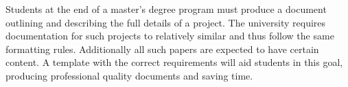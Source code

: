 \label{sec:problem_definition_statement}
Students at the end of a master's degree program must produce a document outlining and describing the full details of a project. The university requires documentation for such projects to relatively similar and thus follow the same formatting rules. Additionally all such papers are expected to have certain content. A template with the correct requirements will aid students in this goal, producing professional quality documents and saving time.